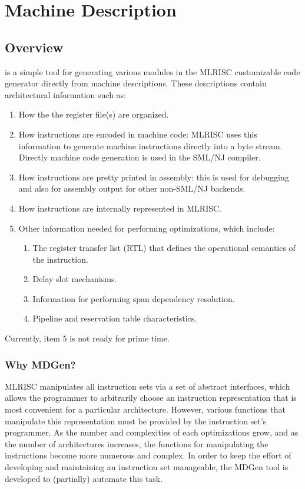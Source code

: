 \section{Machine Description}
\subsection{Overview}

   is a simple tool for generating 
various modules in the MLRISC customizable code generator
directly from machine descriptions.   These descriptions 
contain architectural information such as:
\begin{enumerate}
    \item How the the register file(s) are organized.   
    \item How instructions are encoded in machine code: MLRISC uses
this information to generate machine instructions directly into a byte stream.
Directly machine code generation is used in the SML/NJ compiler.
    \item How instructions are pretty printed in assembly: this is used
for debugging and also for assembly output for other non-SML/NJ backends.
    \item How instructions are internally represented in MLRISC. 
   \item Other information needed for performing optimizations, which
        include:
   \begin{enumerate}
     \item The register transfer list (RTL) that defines the 
           operational semantics of the instruction.
     \item Delay slot mechanisms.
     \item Information for performing span dependency resolution.
     \item Pipeline and reservation table characteristics.
   \end{enumerate}
\end{enumerate}

Currently, item 5 is not ready for prime time.

\subsubsection{Why MDGen?}
MLRISC manipulates all instruction sets via a set of abstract
interfaces, which allows the programmer to arbitrarily choose an
instruction representation that is most convenient for a particular 
architecture.  However, various functions that manipulate
this representation must be provided by the instruction set's programmer.  
As the number and complexities of each optimizations grow, and as
the number of architectures increases, the functions
for manipulating the instructions become more numerous and complex.
In order to keep the effort of developing and maintaining
an instruction set manageable,
the MDGen tool is developed to (partially) automate this task.
 
